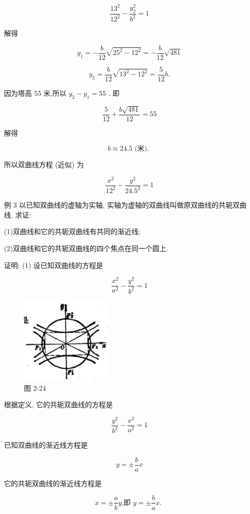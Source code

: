 \documentclass[lang=cn,newtx,10pt,scheme=chinese]{elegantbook}
\begin{document}
\[
  \frac{{13}^{2}}{{12}^{2}} - \frac{{y}_{2}^{2}}{{b}^{2}} = 1
\]

解得

\[
    {y}_{1} = - \frac{b}{12}\sqrt{{25}^{2} - {12}^{2}} = - \frac{b}{12}\sqrt{481}
\]

\[
    {y}_{2} = \frac{b}{12}\sqrt{{13}^{2} - {12}^{2}} = \frac{5}{12}b.
\]

因为塔高 55 米,所以 \({y}_{2} - {y}_{1} = {55}\) . 即

\[
  \frac{5}{12} + \frac{b\sqrt{481}}{12} = {55}
\]

解得

\[
  b \approx {24.5}\text{ (米). }
\]

所以双曲线方程 (近似) 为

\[
  \frac{{x}^{2}}{{12}^{2}} - \frac{{y}^{2}}{{24.5}^{2}} = 1
\]

例 3 以已知双曲线的虚轴为实轴, 实轴为虚轴的双曲线叫做原双曲线的共轭双曲线. 求证:

(1)双曲线和它的共轭双曲线有共同的渐近线;

(2)双曲线和它的共轭双曲线的四个焦点在同一个圆上.

证明: (1) 设已知双曲线的方程是

\[
  \frac{{x}^{2}}{{a}^{2}} - \frac{{y}^{2}}{{b}^{2}} = 1
\]

\begin{figure}[h]
  \centering
  \includegraphics[max width=0.4\textwidth]{images/01912cc2-ffb6-728e-9ae7-b113ff05c64b_104_706159.jpg}
  \caption{图 2-24}
\end{figure}



根据定义, 它的共轭双曲线的方程是

\[
  \frac{{y}^{2}}{{b}^{2}} - \frac{{x}^{2}}{{a}^{2}} = 1
\]

已知双曲线的渐近线方程是

\[
  y = \pm \frac{b}{a}x
\]

它的共轭双曲线的渐近线方程是

\[
  x = \pm \frac{a}{b}y\text{,即 }y = \pm \frac{b}{a}x\text{. }
\]
\end{document}
